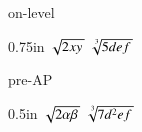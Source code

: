 \begin{taggedblock}{on-level}
    \begin{my2Problems}{0.75in}
        {
            $   \myRoot{2xy}   $ 
        }
        {
            $ \myRoot[3]{5def} $ 
        }
    \end{my2Problems}
\end{taggedblock}
\begin{taggedblock}{pre-AP}
    \begin{my2Problems}{0.5in}
        {
            $   \myRoot{2\alpha\beta}   $ 
        }
        {
            $ \myRoot[3]{7d^2ef} $ 
        }
    \end{my2Problems}
\end{taggedblock}
